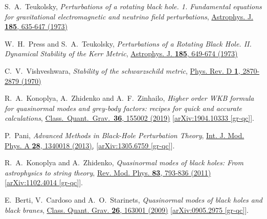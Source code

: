 \documentclass[pr, twocolumn, preprintnumbers, showpacs,footnoteadded, superscriptaddress,nofootinbib,longbibliography]{revtex4-1}
\begin{document}
\begin{thebibliography}{99}
S.~A.~Teukolsky,
\emph{Perturbations of a rotating black hole. 1. Fundamental equations for gravitational electromagnetic and neutrino field perturbations},
\href{http://dx.doi.org/doi:10.1086/152444}{Astrophys. J. \textbf{185}, 635-647 (1973)}

W.~H.~Press and S.~A.~Teukolsky,
\emph{Perturbations of a Rotating Black Hole. II. Dynamical Stability of the Kerr Metric},
\href{https://ui.adsabs.harvard.edu/abs/1973ApJ...185..649P/abstract}{Astrophys. J. \textbf{185}, 649-674 (1973)}


C.~V.~Vishveshwara,
\emph{Stability of the schwarzschild metric},
\href{https://journals.aps.org/prd/abstract/10.1103/PhysRevD.1.2870}{Phys. Rev. D \textbf{1}, 2870-2879 (1970)}


R.~A.~Konoplya, A.~Zhidenko and A.~F.~Zinhailo,
\emph{Higher order WKB formula for quasinormal modes and grey-body factors: recipes for quick and accurate calculations},
\href{https://doi.org/10.1088/1361-6382/ab2e25}{Class.\ Quant.\ Grav.\  {\bf 36}, 155002 (2019)}
[\href{https://arxiv.org/pdf/1904.10333.pdf}{arXiv:1904.10333 [gr-qc]}].


P.~Pani,
\emph{Advanced Methods in Black-Hole Perturbation Theory},
\href{https://www.worldscientific.com/doi/abs/10.1142/S0217751X13400186}{Int. J. Mod. Phys. A \textbf{28}, 1340018 (2013),}
[\href{https://arxiv.org/pdf/1305.6759.pdf}{arXiv:1305.6759 [gr-qc]}].

R.~A.~Konoplya and A.~Zhidenko,
\emph{Quasinormal modes of black holes: From astrophysics to string theory},
\href{https://journals.aps.org/rmp/abstract/10.1103/RevModPhys.83.793}{Rev. Mod. Phys. \textbf{83}, 793-836 (2011)}
[\href{https://arxiv.org/pdf/1102.4014.pdf}{arXiv:1102.4014 [gr-qc]}].

E.~Berti, V.~Cardoso and A.~O.~Starinets,
\emph{Quasinormal modes of black holes and black branes},
\href{https://iopscience.iop.org/article/10.1088/0264-9381/26/16/163001}{Class. Quant. Grav. \textbf{26}, 163001 (2009)}
[\href{https://arxiv.org/pdf/0905.2975.pdf}{arXiv:0905.2975 [gr-qc]}].



\end{thebibliography}
\end{document}
